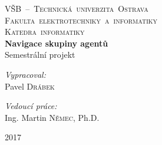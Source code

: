 
\begin{titlepage}
\begin{center}
\textsc{
	\LARGE 
	\mbox{VŠB – Technická univerzita Ostrava}\\
	\mbox{Fakulta elektrotechniky a informatiky}\\
	\mbox{Katedra informatiky}
}\\[3.5cm]
{ \huge \bfseries Navigace skupiny agentů}\\[1.4cm]
\Large Semestrální projekt\\[0.5cm]
\begin{minipage}{0.4\textwidth}
\begin{flushleft} \large
\emph{Vypracoval:}\\
Pavel \textsc{Drábek}
\end{flushleft}
\end{minipage}
\begin{minipage}{0.5\textwidth}
\begin{flushright} \large
\emph{Vedoucí práce:} \\
Ing. Martin \textsc{Němec}, Ph.D.
\end{flushright}
\end{minipage}
\vfill
{\large 2017}
\end{center}
\end{titlepage}

